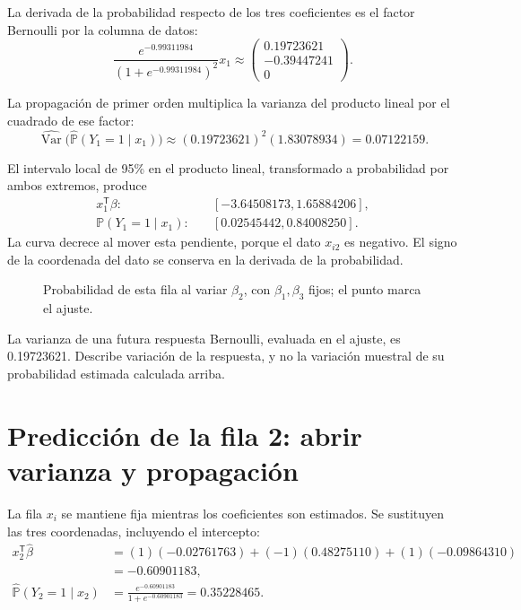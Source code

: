 \documentclass[11pt,a4paper]{article}
\newcommand{\Prob}{\mathbb P}
\newcommand{\T}{^{\mathsf T}}
\DeclareMathOperator{\Var}{Var}
\begin{document}
La derivada de la probabilidad respecto de los tres coeficientes
es el factor Bernoulli por la columna de datos:
\[
\frac{e^{-0.99311984}}{(1+e^{-0.99311984})^2}x_{1}\approx\begin{pmatrix}0.19723621\\-0.39447241\\0\end{pmatrix}.
\]

La propagación de primer orden multiplica la varianza del
producto lineal por el cuadrado de ese factor:
\[
\widehat{\Var}\bigl(\widehat{\Prob}(Y_{1}=1\mid x_{1})\bigr)\approx(0.19723621)^2(1.83078934)=0.07122159.
\]

El intervalo local de 95\% en el producto lineal,
transformado a probabilidad por ambos extremos, produce
\[
\begin{aligned}
x_{1}\T\beta:&\quad[-3.64508173,1.65884206],\\\Prob(Y_{1}=1\mid x_{1}):&\quad[0.02545442,0.84008250].\end{aligned}
\]
La curva decrece al mover esta pendiente, porque el dato $x_{i2}$ es negativo. El signo de la coordenada del dato se conserva en la derivada de la probabilidad.
\begin{figure}[H]\centering
{}
\caption{Probabilidad de esta fila al variar \(\beta_2\), con \(\beta_1,\beta_3\) fijos; el punto marca el ajuste.}
\end{figure}

La varianza de una futura respuesta Bernoulli,
evaluada en el ajuste, es 0.19723621.
Describe variación de la respuesta, y no la variación
muestral de su probabilidad estimada calculada arriba.
\endgroup

\clearpage
\section{Predicción de la fila 2: abrir varianza y propagación}\label{logit111}
\begingroup\small
\setlength{\abovedisplayskip}{4pt}\setlength{\belowdisplayskip}{4pt}
La fila \(x_i\) se mantiene fija mientras los coeficientes
son estimados. Se sustituyen las tres coordenadas,
incluyendo el intercepto:
\[
\begin{aligned}
x_{2}\T\widehat\beta&=(1)(-0.02761763)+(-1)(0.48275110)+(1)(-0.09864310)\\&=-0.60901183,\\\widehat{\Prob}(Y_{2}=1\mid x_{2})&=\frac{e^{-0.60901183}}{1+e^{-0.60901183}}=0.35228465.\end{aligned}
\]
\end{document}
